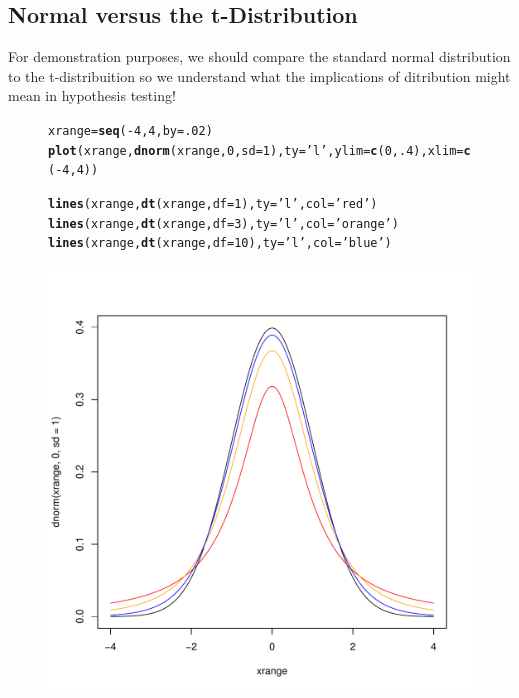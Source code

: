 \documentclass{tufte-handout}\usepackage[]{graphicx}\usepackage[]{color}
\makeatletter
\def\maxwidth{ %
  \ifdim\Gin@nat@width>\linewidth
    \linewidth
  \else
    \Gin@nat@width
  \fi
}
\newcommand{\hlnum}[1]{\textcolor[rgb]{0.686,0.059,0.569}{#1}}%
\newcommand{\hlstr}[1]{\textcolor[rgb]{0.192,0.494,0.8}{#1}}%
\newcommand{\hlopt}[1]{\textcolor[rgb]{0,0,0}{#1}}%
\newcommand{\hlstd}[1]{\textcolor[rgb]{0.345,0.345,0.345}{#1}}%
\newcommand{\hlkwb}[1]{\textcolor[rgb]{0.69,0.353,0.396}{#1}}%
\newcommand{\hlkwc}[1]{\textcolor[rgb]{0.333,0.667,0.333}{#1}}%
\newcommand{\hlkwd}[1]{\textcolor[rgb]{0.737,0.353,0.396}{\textbf{#1}}}%
\newenvironment{kframe}{%
 \def\at@end@of@kframe{}%
 \ifinner\ifhmode%
  \def\at@end@of@kframe{\end{minipage}}%
  \begin{minipage}{\columnwidth}%
 \fi\fi%
 \def\FrameCommand##1{\hskip\@totalleftmargin \hskip-\fboxsep
 \colorbox{shadecolor}{##1}\hskip-\fboxsep
     \hskip-\linewidth \hskip-\@totalleftmargin \hskip\columnwidth}%
 \MakeFramed {\advance\hsize-\width
   \@totalleftmargin\z@ \linewidth\hsize
   \@setminipage}}%
 {\par\unskip\endMakeFramed%
 \at@end@of@kframe}
\newenvironment{knitrout}{}{} %
\makeatother
\begin{document}
\subsection{Normal versus the t-Distribution}

For demonstration purposes, we should compare the standard normal distribution to the t-distribuition so we understand what the implications of ditribution might mean in hypothesis testing!

\begin{figure}
\begin{knitrout}
\color{fgcolor}\begin{kframe}
\begin{alltt}
\hlstd{xrange} \hlkwb{=} \hlkwd{seq}\hlstd{(}\hlopt{-}\hlnum{4}\hlstd{,} \hlnum{4}\hlstd{,} \hlkwc{by}\hlstd{=}\hlnum{.02}\hlstd{)}
\hlkwd{plot}\hlstd{(xrange,} \hlkwd{dnorm}\hlstd{(xrange,} \hlnum{0}\hlstd{,} \hlkwc{sd}\hlstd{=}\hlnum{1}\hlstd{),} \hlkwc{ty}\hlstd{=}\hlstr{'l'}\hlstd{,} \hlkwc{ylim}\hlstd{=}\hlkwd{c}\hlstd{(}\hlnum{0}\hlstd{,}\hlnum{.4}\hlstd{),} \hlkwc{xlim}\hlstd{=}\hlkwd{c}\hlstd{(}\hlopt{-}\hlnum{4}\hlstd{,}\hlnum{4}\hlstd{))}

\hlkwd{lines}\hlstd{(xrange,} \hlkwd{dt}\hlstd{(xrange,} \hlkwc{df}\hlstd{=}\hlnum{1}\hlstd{),} \hlkwc{ty}\hlstd{=}\hlstr{'l'}\hlstd{,} \hlkwc{col}\hlstd{=}\hlstr{'red'}\hlstd{)}
\hlkwd{lines}\hlstd{(xrange,} \hlkwd{dt}\hlstd{(xrange,} \hlkwc{df}\hlstd{=}\hlnum{3}\hlstd{),} \hlkwc{ty}\hlstd{=}\hlstr{'l'}\hlstd{,} \hlkwc{col}\hlstd{=}\hlstr{'orange'}\hlstd{)}
\hlkwd{lines}\hlstd{(xrange,} \hlkwd{dt}\hlstd{(xrange,} \hlkwc{df}\hlstd{=}\hlnum{10}\hlstd{),} \hlkwc{ty}\hlstd{=}\hlstr{'l'}\hlstd{,} \hlkwc{col}\hlstd{=}\hlstr{'blue'}\hlstd{)}
\end{alltt}
\end{kframe}
\includegraphics[width=\maxwidth]{figure/unnamed-chunk-23-1} 

\end{knitrout}
\end{figure}
\end{document}
